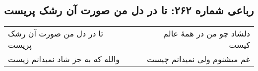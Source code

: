 \begin{center}
\section*{رباعی شماره ۲۶۲: تا در دل من صورت آن رشک پریست}
\label{sec:0262}
\begin{longtable}{l p{0.5cm} r}
تا در دل من صورت آن رشک پریست
&&
دلشاد چو من در همهٔ عالم کیست
\\
والله که به جز شاد نمیدانم زیست
&&
غم میشنوم ولی نمیدانم چیست
\\
\end{longtable}
\end{center}
